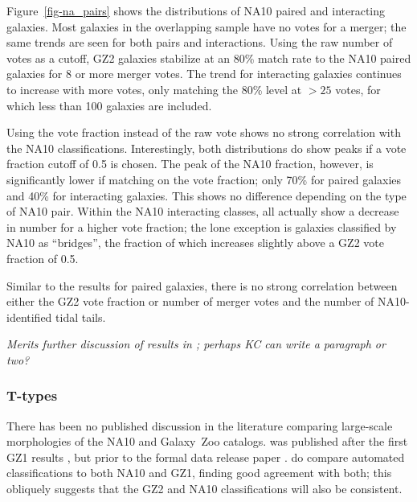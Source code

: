 \documentclass[useAMS,usenatbib]{mn2e}
\begin{document}
Figure~\ref{fig-na_pairs} shows the distributions of NA10 paired and interacting galaxies. Most galaxies in the overlapping sample have no votes for a merger; the same trends are seen for both pairs and interactions. Using the raw number of votes as a cutoff, GZ2 galaxies stabilize at an 80\% match rate to the NA10 paired galaxies for 8 or more merger votes. The trend for interacting galaxies continues to increase with more votes, only matching the 80\% level at $>25$ votes, for which less than 100 galaxies are included.

Using the vote fraction instead of the raw vote shows no strong correlation with the NA10 classifications. Interestingly, both distributions do show peaks if a vote fraction cutoff of 0.5 is chosen. The peak of the NA10 fraction, however, is significantly lower if matching on the vote fraction; only 70\% for paired galaxies and 40\% for interacting galaxies. This shows no difference depending on the type of NA10 pair. Within the NA10 interacting classes, all actually show a decrease in number for a higher vote fraction; the lone exception is galaxies classified by NA10 as ``bridges'', the fraction of which increases slightly above a GZ2 vote fraction of 0.5. 

Similar to the results for paired galaxies, there is no strong correlation between either the GZ2 vote fraction or number of merger votes and the number of NA10-identified tidal tails. 

{\em Merits further discussion of results in \citet{cas13}; perhaps KC can write a paragraph or two?}

\subsubsection{T-types}

There has been no published discussion in the literature comparing large-scale morphologies of the NA10 and Galaxy~Zoo catalogs. \citet{nai10} was published after the first GZ1 results \citep{lin08}, but prior to the formal data release paper \citep{lin11}. \citet{hue11} do compare automated classifications to both NA10 and GZ1, finding good agreement with both; this obliquely suggests that the GZ2 and NA10 classifications will also be consistent. 
\end{document}
